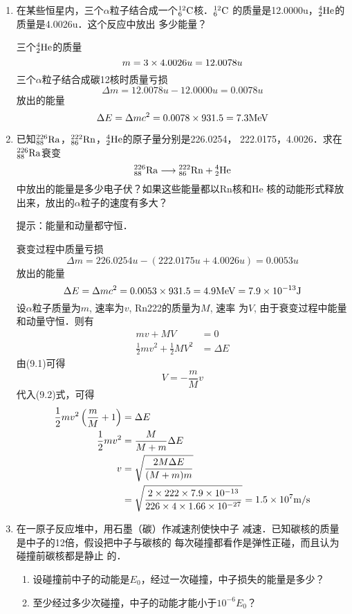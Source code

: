 \begin{enumerate}
\begin{solution}
\end{solution}
\item 在某些恒星内，三个$\alpha$粒子结合成一个$\atom{C}{12}{6}$核．$\atom{C}{12}{6}$
的质量是12.0000u，$\atom{He}{4}{2}$的质量是4.0026u．这个反应中放出
多少能量？

\begin{solution}
    三个$\atom{He}{4}{2}$的质量
 \[   m=3\x4.0026u=12.0078u\]
    三个$\alpha$粒子结合成碳12核时质量亏损
\[\Delta m=12.0078u-12.0000u=0.0078u\]
    放出的能量
\[\Delta E=\Delta mc^2=0.0078\x931.5=7.3{\rm MeV}\]
\end{solution}
\item 已知$\atom{Ra}{226}{88}$，$\atom{Rn}{222}{86}$，$\atom{He}{4}{2}$的原子量分别是226.0254，
222.0175，4.0026．求在$\atom{Ra}{226}{88}$衰变
\[\atom{Ra}{226}{88}\longrightarrow \atom{Rn}{222}{86}+\atom{He}{4}{2}\]
中放出的能量是多少电子伏？如果这些能量都以Rn核和He
核的动能形式释放出来，放出的$\alpha$粒子的速度有多大？

提示：能量和动量都守恒．

\begin{solution}
    衰变过程中质量亏损
\[\Delta m=226.0254u-(222.0175u+4.0026u)=0.0053u\]
放出的能量
\[\Delta E=\Delta mc^2=0.0053\x931.5=4.9{\rm MeV}=7.9\x10^{-13}{\rm J}\]
设$\alpha$粒子质量为$m$, 速率为$v$, Rn222的质量为$M$, 速率
为$V$, 由于衰变过程中能量和动量守恒．则有
\begin{align}
    mv+MV&=0\\
    \frac{1}{2}mv^2+\frac{1}{2}MV^2&=\Delta E
\end{align}
由(9.1)可得
\[V=-\frac{m}{M}v\]
代入(9.2)式，可得
\[\begin{split}
    \frac{1}{2}mv^2\left(\frac{m}{M}+1\right)&=\Delta E\\
    \frac{1}{2}mv^2&=\frac{M}{M+m}\Delta E\\
v&=\sqrt{\frac{2M\Delta E}{(M+m)m}}\\
&=\sqrt{\frac{2\x222\x7.9\x10^{-13}}{226\x4\x1.66\x10^{-27}}}=1.5\x10^7\ms
\end{split}\]
\end{solution}
\item 在一原子反应堆中，用石墨（碳）作减速剂使快中子
减速．已知碳核的质量是中子的12倍，假设把中子与碳核的
每次碰撞都看作是弹性正碰，而且认为碰撞前碳核都是静止
的．
\begin{enumerate}
    \item 设碰撞前中子的动能是$E_0$，经过一次碰撞，中子损失的能量是多少？
    \item 至少经过多少次碰撞，中子的动能才能小于$10^{-6}E_0$？
\end{enumerate}


\end{enumerate}
